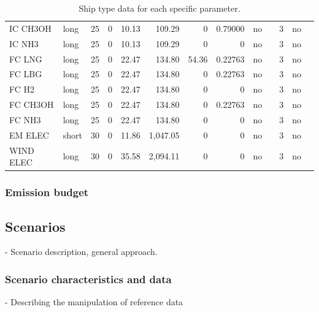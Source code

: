 \documentclass[article]{elsarticle}
\begin{document}
\begin{table}[htbp]
{\begin{tabular}{llrrrrrrrrrrr}
        IC CH3OH       & long  & 25     & 0      & 10.13       & 109.29   & 0                & 0.79000          & no    &                & 3           & no       \\
        IC NH3         & long  & 25     & 0      & 10.13       & 109.29   & 0                & 0                & no    &                & 3           & no       \\
        FC LNG         & long  & 25     & 0      & 22.47       & 134.80   & 54.36            & 0.22763          & no    &                & 3           & no       \\
        FC LBG         & long  & 25     & 0      & 22.47       & 134.80   & 0                & 0.22763          & no    &                & 3           & no       \\
        FC H2          & long  & 25     & 0      & 22.47       & 134.80   & 0                & 0                & no    &                & 3           & no       \\
        FC CH3OH       & long  & 25     & 0      & 22.47       & 134.80   & 0                & 0.22763          & no    &                & 3           & no       \\
        FC NH3         & long  & 25     & 0      & 22.47       & 134.80   & 0                & 0                & no    &                & 3           & no       \\
        EM ELEC        & short & 30     & 0      & 11.86       & 1,047.05 & 0                & 0                & no    &                & 3           & no       \\
        WIND ELEC      & long  & 30     & 0      & 35.58       & 2,094.11 & 0                & 0                & no    &                & 3           & no \\  
    \bottomrule
    \end{tabular}}
    \caption[Ship type data]{Ship type data for each specific parameter.}
    \label{tab:ship-type_data}
\end{table}

\subsubsection{Emission budget}

\subsection{Scenarios}
\label{subsec:Sce}
- Scenario description, general approach.
\subsubsection{Scenario characteristics and data}
- Describing the manipulation of reference data
\end{document}
